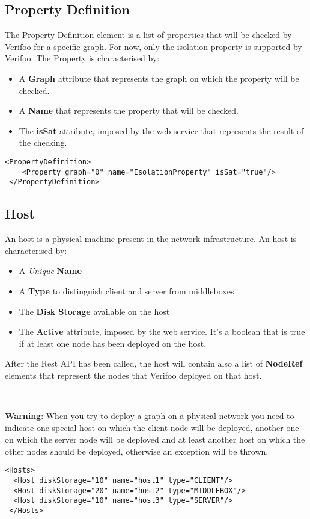 \documentclass[a4paper,11pt]{article}
\newenvironment{warning}
  {\par\begin{mdframed}[backgroundcolor=mypink,linewidth=2pt,linecolor=red]%
    \begin{list}{}{\leftmargin=1cm
                   \labelwidth=\leftmargin}\item[\Large\ding{43}]}
  {\end{list}\end{mdframed}\par}
\begin{document}
\subsection*{Property Definition}
The Property Definition element is a list of properties that will be checked by Verifoo for a specific graph. For now, only the isolation property is supported by Verifoo.
The Property is characterised by:
\begin{itemize}
    \item A \textbf{Graph} attribute that represents the graph on which the property will be checked.
    \item A \textbf{Name} that represents the property that will be checked.
    \item The \textbf{isSat} attribute, imposed by the web service that represents the result of the checking.
\end{itemize}
\begin{lstlisting}[label={list:seventeenth},caption=Property Definition Example]
<PropertyDefinition>
  	<Property graph="0" name="IsolationProperty" isSat="true"/> 		
 </PropertyDefinition>
\end{lstlisting}
\subsection*{Host}
An host is a physical machine present in the network infrastructure.
An host is characterised by:
\begin{itemize}
    \item A \textit{Unique} \textbf{Name}
    \item A \textbf{Type} to distinguish client and server from middleboxes
    \item The \textbf{Disk Storage} available on the host
    \item The \textbf{Active} attribute, imposed by the web service. It's a boolean that is true if at least one node has been deployed on the host.
\end{itemize}
After the Rest API has been called, the host will contain also a list of \textbf{NodeRef} elements that represent the nodes that Verifoo deployed on that host.
\begin{warning}
\textbf{Warning}: When you try to deploy a graph on a physical network you need to indicate one special host on which the client node will be deployed, another one on which the server node will be deployed and at least another host on which the other nodes should be deployed, otherwise an exception will be thrown.
\end{warning}
\begin{lstlisting}[label={list:eighteenth},caption=Hosts Example]
<Hosts>
  <Host diskStorage="10" name="host1" type="CLIENT"/>
  <Host diskStorage="20" name="host2" type="MIDDLEBOX"/>
  <Host diskStorage="10" name="host3" type="SERVER"/>
 </Hosts>
\end{lstlisting}
\end{document}
